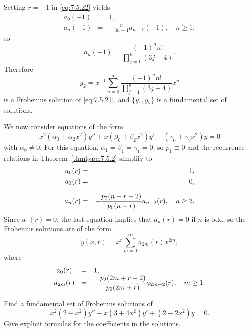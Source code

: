 \begin{examplesolution}
Setting $r=-1$ in \eqref{eq:7.5.22} yields
\begin{eqnarray*}
  a_{0}(-1) & = & 1, \\
  a_{n}(-1) & = & -\frac{n}{3n-4}a_{n-1}(-1),\quad n\ge1,
\end{eqnarray*}
so
\[
  a_{n}(-1)=\frac{(-1)^{n}n!}{\prod_{j=1}^{n}(3j-4)}.
\]
Therefore
\[
  y_{2}=x^{-1}\sum_{n=0}^{\infty}\frac{(-1)^{n}n!}{\prod_{j=1}^{n}(3j-4)}x^{n}
\]
is a Frobenius solution of \eqref{eq:7.5.21}, and $\{y_{1},y_{2}\}$ is a fundamental set of
solutions. \bbox
\end{examplesolution}

We now consider equations of the form
\begin{equation}
  \label{eq:7.5.23}x^{2}(\alpha_{0}+\alpha_{2}x^{2})y''+x(\beta_{0}+\beta_{2}x^{2})y'+ (\gamma_{0}+\gamma_{2}x^{2})y=0
\end{equation}
with $\alpha_{0}\ne0$. For this equation, $\alpha_{1}=\beta_{1}=\gamma_{1}=0$, so $p_{1}\equiv0$ and
the recurrence relations in Theorem~\ref{thmtype:7.5.2} simplify to
\begin{eqnarray*}
  a_{0}(r) & = & 1, \\
  a_{1}(r) & = & 0, \\[2\jot]
  a_{n}(r) & = & -\displaystyle\frac{p_{2}(n+r-2)}{p_{0}(n+r)}a_{n-2}(r),\quad n\ge2.
\end{eqnarray*}
Since $a_{1}(r)=0$, the last equation implies that $a_{n}(r)=0$ if $n$ is odd, so the Frobenius
solutions are of the form
\[
  y(x,r)=x^{r}\sum_{m=0}^{\infty}a_{2m}(r)x^{2m},
\]
where
\begin{equation}
  \label{eq:7.5.24}
  \begin{array}{ccl}
    a_{0}(r)  & = & 1,                                                             \\
    a_{2m}(r) & = & -\displaystyle\frac{p_{2}(2m+r-2)}{p_{0}(2m+r)}a_{2m-2}(r),\quad m\ge1.
  \end{array}
\end{equation}

\begin{example}
  \label{example:7.5.3}\rm Find a fundamental set of Frobenius solutions of
  \begin{equation}
    \label{eq:7.5.25}x^{2}(2-x^{2})y''-x(3+4x^{2})y'+(2-2x^{2})y=0.
  \end{equation}
  Give explicit formulas for the coefficients in the solutions.
\end{example}

